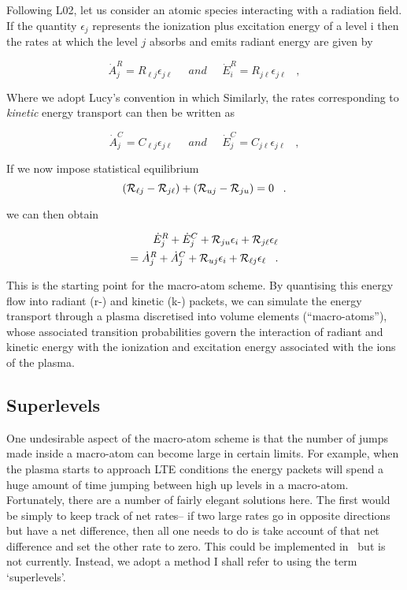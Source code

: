 Following L02, let us consider an atomic species interacting with a radiation field.
If the quantity $\epsilon_j$ represents the ionization plus excitation energy of 
a level i then the rates at which the level $j$ absorbs and emits radiant energy 
are given by

\begin{equation}
 \dot{A}_{j}^{R} = R_{\ell j} \epsilon_{j \ell} \;\;\;\;\; and \;\;\;
\;\;  \dot{E}_{i}^{R} = R_{j \ell} \epsilon_{j \ell} \;\;\; ,
\end{equation}

Where we adopt Lucy's convention in which 
Similarly, the rates corresponding to {\em kinetic} energy transport can then be written as

\begin{equation}
 \dot{A}_{j}^{C} = C_{\ell j} \epsilon_{j \ell} \;\;\;\;\; and
\;\;\;
\;\;  \dot{E}_{j}^{C} = C_{j \ell} \epsilon_{j \ell} \;\;\; ,
\end{equation}

If we now impose statistical equilibrium
%
\begin{equation}
 ({\cal R}_{\ell j}-{\cal R}_{j \ell})+({\cal R}_{uj}-{\cal R}_{ju})=0 \;\;\;.
\end{equation}
 
we can then obtain 

\begin{eqnarray}
 \dot{E}_{j}^{R}+\dot{E}_{j}^{C}+{\cal R}_{ju}\epsilon_{i}+
 {\cal R}_{j \ell}\epsilon_{\ell}  \nonumber \\  
 = \dot{A}_{j}^{R}+\dot{A}_{j}^{C}+{\cal R}_{uj} \epsilon_{i}
 +{\cal R}_{\ell j} \epsilon_{\ell}            \;\;\; .       
\end{eqnarray}

This is the starting point for the macro-atom scheme. By quantising this energy flow
into radiant (r-) and kinetic (k-) packets, we can simulate the energy transport through
a plasma discretised into volume elements (``macro-atoms''),
whose associated transition probabilities govern the interaction 
of radiant and kinetic energy with the ionization and excitation energy associated 
with the ions of the plasma.

\subsection{Superlevels}

One undesirable aspect of the macro-atom scheme is that the number of 
jumps made inside a macro-atom can become large in certain limits.
For example, when the plasma starts to approach LTE conditions
the energy packets will spend a huge amount of time
jumping between high up levels in a macro-atom. Fortunately, there
are a number of fairly elegant solutions here. The first would be simply 
to keep track of net rates-- if two large rates go in opposite directions
but have a net difference, then all one needs to do is take account of that net
difference and set the other rate to zero. This could be implemented in \py\, but
is not currently. Instead, we adopt a method I shall refer to using the 
term `superlevels'. 

